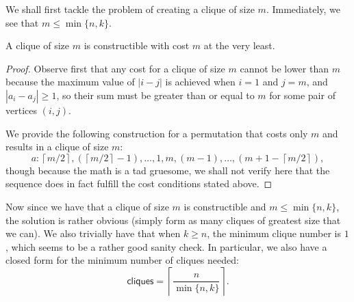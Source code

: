 \documentclass[a4paper, 12pt]{article}
\begin{document}
\begin{solution}
    We shall first tackle the problem of creating a clique of size \( m \). Immediately, we see that \( m \le \min\{n, k\} \).

    \begin{claim}
        A clique of size \( m \) is constructible with cost \( m \) at the very least.
    \end{claim}
    \begin{proof}
        Observe first that any cost for a clique of size \( m \) cannot be lower than \( m \) because the maximum value of \( |i - j| \) is achieved when \( i = 1 \) and \( j = m \), and \( |a_i - a_j| \ge 1 \), so their sum must be greater than or equal to \( m \) for some pair of vertices \( (i, j) \).

        We provide the following construction for a permutation that costs only \( m \) and results in a clique of size \( m \):
        \[
            a: \left\lceil m / 2 \right\rceil, (\left\lceil m / 2 \right\rceil - 1), \ldots, 1, m, (m-1), \ldots, (m + 1 - \left\lceil m / 2 \right\rceil)
        ,\]
        though because the math is a tad gruesome, we shall not verify here that the sequence does in fact fulfill the cost conditions stated above.
    \end{proof}

    Now since we have that a clique of size \( m \) is constructible and \( m \le \min\{n, k\} \), the solution is rather obvious (simply form as many cliques of greatest size that we can). We also trivially have that when \( k \ge n \), the minimum clique number is \( 1 \), which seems to be a rather good sanity check. In particular, we also have a closed form for the minimum number of cliques needed:
    \[
        \textsf{cliques} = \left\lceil \frac{n}{\min\{n, k\}} \right\rceil
    .\]
\end{solution}
\end{document}
